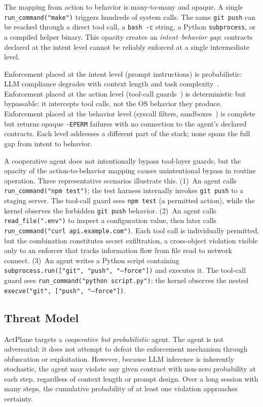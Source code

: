 The mapping from action to behavior is many-to-many and opaque. A single
\texttt{run\_command("make")} triggers hundreds of system calls. The same
\texttt{git push} can be reached through a direct tool call, a
\texttt{bash~-c} string, a Python \texttt{subprocess}, or a compiled helper
binary. This opacity creates an \emph{intent--behavior gap}: contracts
declared at the intent level cannot be reliably enforced at a single
intermediate level.

Enforcement placed at the intent level (prompt instructions) is
probabilistic: LLM compliance degrades with context length and task
complexity~\cite{liu2024lost}. Enforcement placed at the action level (tool-call
guards~\cite{wang2025agentspec,shi2025progent}) is deterministic but
bypassable: it intercepts tool calls, not the OS behavior they produce.
Enforcement placed at the behavior level (syscall filters,
sandboxes~\cite{pasquier2018camquery,ciliumtetragon}) is complete but
returns opaque \texttt{-EPERM} failures with no connection to the agent's
declared contracts. Each level addresses a different part of the stack;
none spans the full gap from intent to behavior.

A cooperative agent does not intentionally bypass tool-layer guards, but
the opacity of the action-to-behavior mapping causes unintentional bypass
in routine operation. Three representative scenarios illustrate this.
(1)~An agent calls \texttt{run\_command("npm~test")}; the test harness
internally invokes \texttt{git~push} to a staging server. The tool-call
guard sees \texttt{npm~test} (a permitted action), while the kernel
observes the forbidden \texttt{git~push} behavior.
(2)~An agent calls \texttt{read\_file(".env")} to inspect a configuration
value, then later calls \texttt{run\_command("curl~api.example.com")}.
Each tool call is individually permitted, but the combination constitutes
secret exfiltration, a cross-object violation visible only to an enforcer
that tracks information flow from file read to network connect.
(3)~An agent writes a Python script containing
\texttt{subprocess.run(["git",~"push",~"--force"])} and executes it. The
tool-call guard sees \texttt{run\_command("python~script.py")}; the kernel
observes the nested \texttt{execve("git",~["push",~"--force"])}.

\subsection{Threat Model}

ActPlane targets a \emph{cooperative but probabilistic} agent. The agent is
not adversarial: it does not attempt to defeat the enforcement mechanism
through obfuscation or exploitation. However, because LLM inference is
inherently stochastic, the agent may violate any given contract with
non-zero probability at each step, regardless of context length or prompt
design. Over a long session with many steps, the cumulative probability of
at least one violation approaches certainty.

